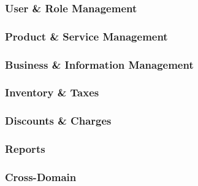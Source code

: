 \documentclass[]{VUMIFTemplateClass}
\begin{document}
\subsubsection{User \& Role Management}
\subsubsection{Product \& Service Management}
\subsubsection{Business \& Information Management}
\subsubsection{Inventory \& Taxes}
\subsubsection{Discounts \& Charges}
\subsubsection{Reports}

\subsubsection{Cross-Domain}


\printbibliography[title = {References and sources}]
\end{document}
